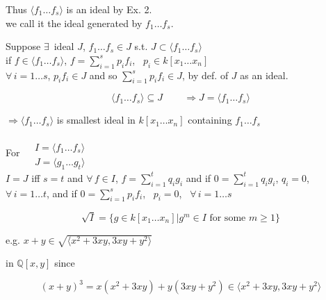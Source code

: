 Thus $\langle f_1 \dots f_s\rangle$ is an ideal by Ex. 2.  \\

we call it the ideal generated by $f_1 \dots f_s$.  

 Suppose $\exists \, $ ideal $J$, $f_1 \dots f_s \in J$ s.t. $J \subset \langle f_1 \dots f_s \rangle$ \\
if $f\in \langle f_1 \dots f_s \rangle$, $f = \sum_{i=1}^s p_i f_i$, \, $p_i \in k[x_1 \dots x_n]$ \\

$\forall \, i = 1 \dots s$, $p_i f_i \in J$ and so $\sum_{i=1}^s p_i f_i \in J$, by def. of $J$ as an ideal.

\[
\langle f_1 \dots f_s \rangle \subseteq J \quad \quad \, \Longrightarrow J = \langle f_1 \dots f_s \rangle
\]

$\Longrightarrow \langle f_1 \dots f_s \rangle$ is smallest ideal in $k[x_1 \dots x_n]$ containing $f_1 \dots f_s$


 For $\begin{aligned} & \quad \\
  & I = \langle f_1 \dots f_s \rangle \\
  & J = \langle g_1 \dots g_t \rangle \end{aligned}$ \\

 $I = J$ iff $s=t$ and $\forall \, f \in I$, $f = \sum_{i=1}^t q_i g_i$ and if $ 0  = \sum_{i=1}^t q_i g_i$, $q_i =0$, \, $\forall \, i = 1 \dots t$, and if $0 = \sum_{i=1}^s p_i f_i$, \, $p_i = 0$, \, $\forall \,  i = 1 \dots s$


\begin{definition}[1.6]
\[
\sqrt{I} = \lbrace g \in k[x_1\dots x_n] | g^m \in I \text{ for some } m \geq 1 \rbrace
\]
\end{definition}

e.g. $x+y \in \sqrt{ \langle x^2 + 3 xy , 3xy + y^2 \rangle }$

in $\mathbb{Q}[x,y]$ since 

\[
(x+y)^3 =x(x^2 + 3xy) + y(3xy + y^2) \in \langle x^2 + 3xy, 3xy + y^2\rangle
\]
















